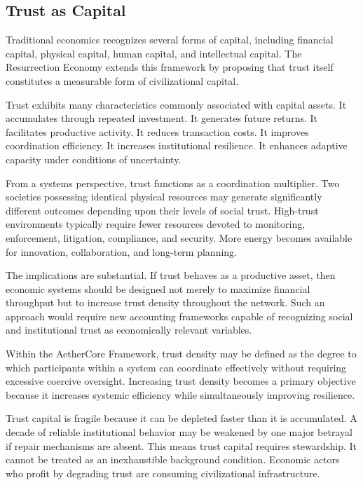 \documentclass[12pt]{article}
\begin{document}
\subsection{Trust as Capital}

Traditional economics recognizes several forms of capital, including financial capital, physical capital, human capital, and intellectual capital. The Resurrection Economy extends this framework by proposing that trust itself constitutes a measurable form of civilizational capital.

Trust exhibits many characteristics commonly associated with capital assets. It accumulates through repeated investment. It generates future returns. It facilitates productive activity. It reduces transaction costs. It improves coordination efficiency. It increases institutional resilience. It enhances adaptive capacity under conditions of uncertainty.

From a systems perspective, trust functions as a coordination multiplier. Two societies possessing identical physical resources may generate significantly different outcomes depending upon their levels of social trust. High-trust environments typically require fewer resources devoted to monitoring, enforcement, litigation, compliance, and security. More energy becomes available for innovation, collaboration, and long-term planning.

The implications are substantial. If trust behaves as a productive asset, then economic systems should be designed not merely to maximize financial throughput but to increase trust density throughout the network. Such an approach would require new accounting frameworks capable of recognizing social and institutional trust as economically relevant variables.

Within the AetherCore Framework, trust density may be defined as the degree to which participants within a system can coordinate effectively without requiring excessive coercive oversight. Increasing trust density becomes a primary objective because it increases systemic efficiency while simultaneously improving resilience.

Trust capital is fragile because it can be depleted faster than it is accumulated. A decade of reliable institutional behavior may be weakened by one major betrayal if repair mechanisms are absent. This means trust capital requires stewardship. It cannot be treated as an inexhaustible background condition. Economic actors who profit by degrading trust are consuming civilizational infrastructure.
\end{document}
